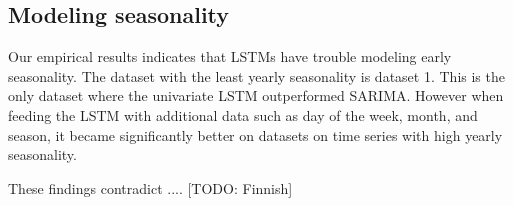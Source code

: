 
\subsection{Modeling seasonality}
Our empirical results indicates that LSTMs have trouble modeling early seasonality.
The dataset with the least yearly seasonality is dataset 1. This is the only dataset where
the univariate LSTM outperformed SARIMA. However when feeding the LSTM with additional
data such as day of the week, month, and season, it became significantly better on datasets
on time series with high yearly seasonality.

These findings contradict \cite[]{Hewamalage2021}.... [TODO: Finnish]



